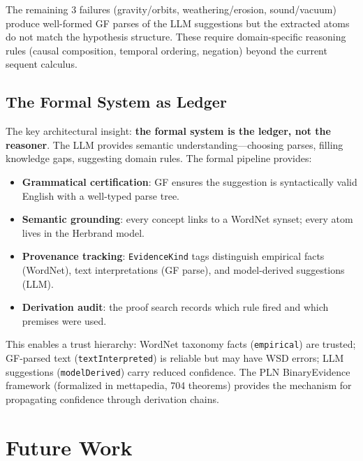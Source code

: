 \documentclass[]{article}
\newcommand{\code}[1]{\texttt{#1}}
\begin{document}
The remaining 3 failures (gravity/orbits, weathering/erosion,
sound/vacuum) produce well-formed GF parses of the LLM suggestions
but the extracted atoms do not match the hypothesis structure.
These require domain-specific reasoning rules (causal composition,
temporal ordering, negation) beyond the current sequent calculus.

\subsection{The Formal System as Ledger}

The key architectural insight: \textbf{the formal system is the ledger,
not the reasoner}.  The LLM provides semantic understanding---choosing
parses, filling knowledge gaps, suggesting domain rules.  The formal
pipeline provides:
\begin{itemize}
\item \textbf{Grammatical certification}: GF ensures the suggestion
  is syntactically valid English with a well-typed parse tree.
\item \textbf{Semantic grounding}: every concept links to a WordNet
  synset; every atom lives in the Herbrand model.
\item \textbf{Provenance tracking}: \code{EvidenceKind} tags
  distinguish empirical facts (WordNet), text interpretations
  (GF parse), and model-derived suggestions (LLM).
\item \textbf{Derivation audit}: the proof search records which
  rule fired and which premises were used.
\end{itemize}

This enables a trust hierarchy: WordNet taxonomy facts
(\code{empirical}) are trusted; GF-parsed text
(\code{textInterpreted}) is reliable but may have WSD errors;
LLM suggestions (\code{modelDerived}) carry reduced confidence.
The PLN BinaryEvidence framework (formalized in mettapedia,
704 theorems) provides the mechanism for propagating confidence
through derivation chains.

\section{Future Work}
\label{sec:future}
\end{document}
